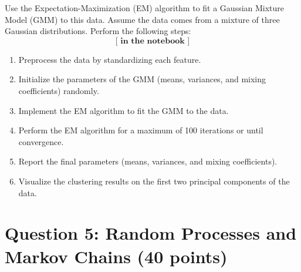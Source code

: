 \documentclass{article}
\begin{document}
\begin{enumerate}
    Use the Expectation-Maximization (EM) algorithm to fit a Gaussian Mixture Model (GMM) to this data. Assume the data comes from a mixture of three Gaussian distributions. Perform the following steps:
    \[
    \textbf{[ in the notebook ]}
    \]
    \begin{enumerate}
        \item Preprocess the data by standardizing each feature.

        \item Initialize the parameters of the GMM (means, variances, and mixing coefficients) randomly.
        \item Implement the EM algorithm to fit the GMM to the data.
        
        \item Perform the EM algorithm for a maximum of 100 iterations or until convergence.
        \item Report the final parameters (means, variances, and mixing coefficients).
        \item Visualize the clustering results on the first two principal components of the data.
    \end{enumerate}
\end{enumerate}


\section*{Question 5: Random Processes and Markov Chains (40 points)}
\end{document}
